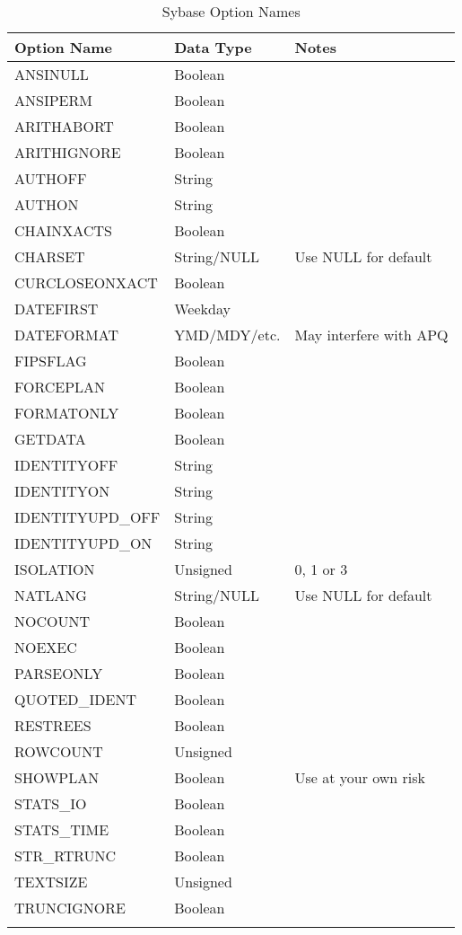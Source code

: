 \documentclass[english,letterpaper]{book}
\begin{document}
\begin{longtable}{lll}
Option Name       &  Data Type            &  Notes\\
\hline 
ANSINULL          &  Boolean              &\\
ANSIPERM          &  Boolean              &\\
ARITHABORT        &  Boolean              &\\
ARITHIGNORE       &  Boolean              &\\
AUTHOFF           &  String               &\\
AUTHON            &  String               &\\
CHAINXACTS        &  Boolean              &\\
CHARSET           &  String/NULL          &  Use NULL for default\\
CURCLOSEONXACT    &  Boolean              &\\
DATEFIRST         &  Weekday              &\\
DATEFORMAT        &  YMD/MDY/etc.         &  May interfere with APQ\\
FIPSFLAG          &  Boolean              &\\
FORCEPLAN         &  Boolean              &\\
FORMATONLY        &  Boolean              &\\
GETDATA           &  Boolean              &\\
IDENTITYOFF       &  String               &\\
IDENTITYON        &  String               &\\
IDENTITYUPD\_OFF  &  String               &\\
IDENTITYUPD\_ON   &  String               &\\
ISOLATION         &  Unsigned             &  0, 1 or 3\\
NATLANG           &  String/NULL          &  Use NULL for default\\
NOCOUNT           &  Boolean              &\\
NOEXEC            &  Boolean              &\\
PARSEONLY         &  Boolean              &\\
QUOTED\_IDENT     &  Boolean              &\\
RESTREES          &  Boolean              &\\
ROWCOUNT          &  Unsigned             &\\
SHOWPLAN          &  Boolean              &  Use at your own risk\\
STATS\_IO         &  Boolean              &\\
STATS\_TIME       &  Boolean              &\\
STR\_RTRUNC       &  Boolean              &\\
TEXTSIZE          &  Unsigned             &\\
TRUNCIGNORE       &  Boolean              &\\
\caption{Sybase Option Names}\label{t:syonames}
\end{longtable}
\end{document}
